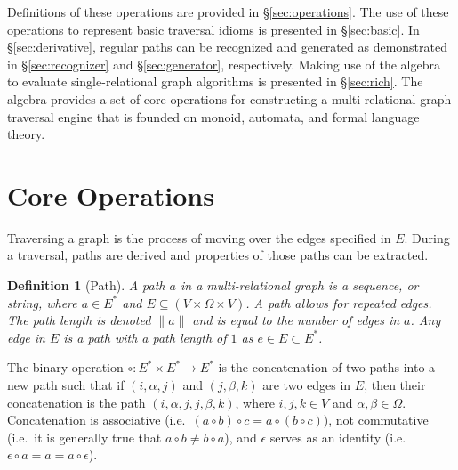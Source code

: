 \documentclass[10pt,conference,letterpaper]{IEEEtran}
\newcommand{\rar}{\rightarrow}
\newtheorem{definition}{Definition}
\begin{document}
Definitions of these operations are provided in \S \ref{sec:operations}. The use of these operations to represent basic traversal idioms is presented in \S \ref{sec:basic}. In \S \ref{sec:derivative}, regular paths can be recognized and generated as demonstrated in \S \ref{sec:recognizer} and \S \ref{sec:generator}, respectively. Making use of the algebra to evaluate single-relational graph algorithms is presented in \S \ref{sec:rich}. The algebra provides a set of core operations for constructing a multi-relational graph traversal engine that is founded on monoid, automata, and formal language theory.

\section{Core Operations\label{sec:operations}}

Traversing a graph is the process of moving over the edges specified in $E$. During a traversal, paths are derived and properties of those paths can be extracted.
\begin{definition}[Path]
A path $a$ in a multi-relational graph is a sequence, or string, where $a \in E^*$ and $E \subseteq (V \times \Omega \times V)$. A path allows for repeated edges. The path length is denoted $\|a\|$ and is equal to the number of edges in $a$. Any edge in $E$ is a path with a path length of $1$ as $e \in E \subset E^*$.
\end{definition}

The binary operation $\circ: E^* \times E^* \rar E^*$ is the concatenation of two paths into a new path such that if $(i,\alpha,j)$ and $(j,\beta,k)$ are two edges in $E$, then their concatenation is the path $(i,\alpha,j,j,\beta,k)$, where $i,j,k \in V$ and $\alpha,\beta \in \Omega$. Concatenation is associative (i.e.~$(a \circ b) \circ c = a \circ (b \circ c)$), not commutative (i.e.~it is generally true that $a \circ b \neq b \circ a$), and $\epsilon$ serves as an identity (i.e.~$\epsilon \circ a = a = a \circ \epsilon$).
\end{document}
